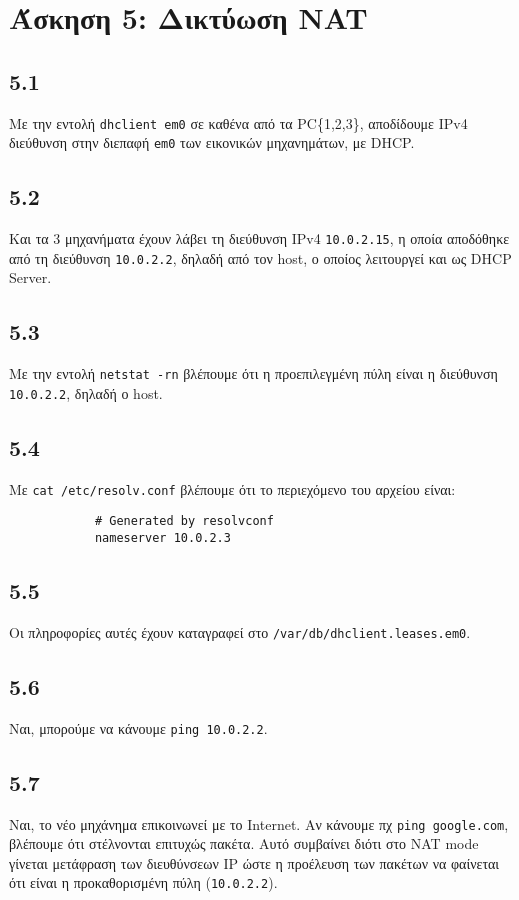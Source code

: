 \documentclass[a4paper, 12pt]{article}
\begin{document}
	
\section*{Άσκηση 5: Δικτύωση NAT}

	\subsection*{5.1}
		Με την εντολή \verb|dhclient em0| σε καθένα από τα PC\{1,2,3\}, αποδίδουμε IPv4 διεύθυνση στην διεπαφή \verb|em0| των εικονικών μηχανημάτων, με DHCP.

	\subsection*{5.2}
		Και τα 3 μηχανήματα έχουν λάβει τη διεύθυνση IPv4 \verb|10.0.2.15|, η οποία αποδόθηκε από τη διεύθυνση \verb|10.0.2.2|, δηλαδή από τον host, ο οποίος λειτουργεί και ως DHCP Server.

	\subsection*{5.3}
		Με την εντολή \verb|netstat -rn| βλέπουμε ότι η προεπιλεγμένη πύλη είναι η διεύθυνση \verb|10.0.2.2|, δηλαδή ο host.

	\subsection*{5.4}
		Με \verb|cat /etc/resolv.conf| βλέπουμε ότι το περιεχόμενο του αρχείου είναι: 
		
		\begin{verbatim}
			# Generated by resolvconf
			nameserver 10.0.2.3
		\end{verbatim}

	\subsection*{5.5}
		Οι πληροφορίες αυτές έχουν καταγραφεί στο \verb|/var/db/dhclient.leases.em0|.

	\subsection*{5.6}
		Ναι, μπορούμε να κάνουμε \verb|ping 10.0.2.2|.

	\subsection*{5.7}
		Ναι, το νέο μηχάνημα επικοινωνεί με το Internet. Αν κάνουμε πχ \verb|ping google.com|, βλέπουμε ότι στέλνονται επιτυχώς πακέτα. Αυτό συμβαίνει διότι στο NAT mode γίνεται μετάφραση των διευθύνσεων IP ώστε η προέλευση των πακέτων να φαίνεται ότι είναι η προκαθορισμένη πύλη (\verb|10.0.2.2|).
\end{document}
